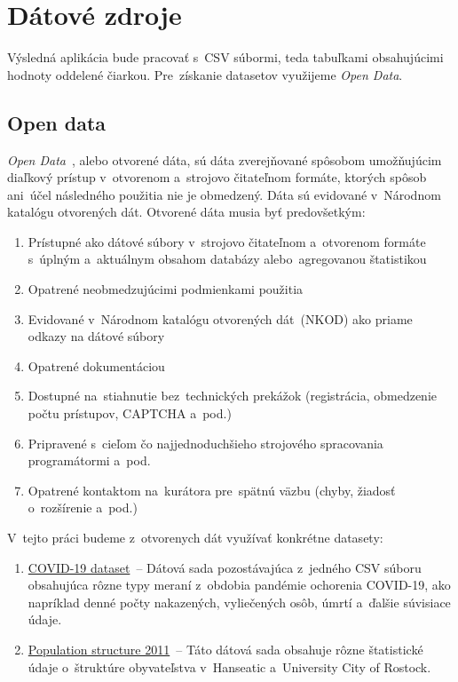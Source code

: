 \chapter{Dátové zdroje}

Výsledná aplikácia bude pracovať s~CSV súbormi, teda tabuľkami obsahujúcimi hodnoty oddelené čiarkou. Pre~získanie datasetov využijeme \textit{Open Data}.

\section{Open data}

\textit{Open Data}~\cite{opendata}, alebo otvorené dáta, sú dáta zverejňované spôsobom umožňujúcim diaľkový prístup v~otvorenom a~strojovo čitateľnom formáte, ktorých spôsob ani~účel následného použitia nie je obmedzený. Dáta sú evidované v~Národnom katalógu otvorených dát. Otvorené dáta musia byť predovšetkým:

\begin{enumerate}
\item Prístupné ako dátové súbory v~strojovo čitateľnom a~otvorenom formáte s~úplným a~aktuálnym obsahom databázy alebo~agregovanou štatistikou
\item Opatrené neobmedzujúcimi podmienkami použitia
\item Evidované v~Národnom katalógu otvorených dát~(NKOD) ako priame odkazy na dátové súbory
\item Opatrené dokumentáciou
\item Dostupné na~stiahnutie bez~technických prekážok (registrácia, obmedzenie počtu prístupov, CAPTCHA a~pod.)
\item Pripravené s~cieľom čo najjednoduchšieho strojového spracovania programátormi a~pod.
\item Opatrené kontaktom na~kurátora pre~spätnú väzbu (chyby, žiadosť o~rozšírenie a~pod.)
\end{enumerate}

V~tejto práci budeme z~otvorenych dát využívať konkrétne datasety:
\begin{enumerate}
\item \href{https://data.gov.cz/datov\%C3\%A1-sada?iri=https\%3A\%2F\%2Fdata.gov.cz\%2Fzdroj\%2Fdatov\%C3\%A9-sady\%2F00024341\%2Fc5b85b8c662a72b9c0c13bea4a098448}{COVID-19 dataset}~-- Dátová sada pozostávajúca z~jedného CSV súboru obsahujúca rôzne typy meraní z~obdobia pandémie ochorenia COVID-19, ako napríklad denné počty nakazených, vyliečených osôb, úmrtí a~ďalšie súvisiace údaje.
\item \href{https://data.europa.eu/data/datasets/92437de0-a730-428a-921d-1d9c418072d6?locale=en}{Population structure 2011}~-- Táto dátová sada obsahuje rôzne štatistické údaje o~štruktúre obyvateľstva v~Hanseatic a~University City of Rostock.
\end{enumerate}


